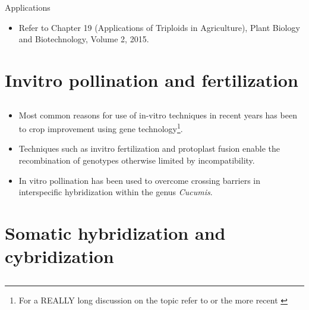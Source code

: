 \documentclass[
  ignorenonframetext,
  aspectratio=169]{beamer}
\providecommand{\tightlist}{%
  \setlength{\itemsep}{0pt}\setlength{\parskip}{0pt}}
\begin{document}
\begin{frame}{Applications}
\begin{itemize}
\tightlist
\item
  Refer to Chapter 19 (Applications of Triploids in Agriculture), Plant
  Biology and Biotechnology, Volume 2, 2015.
\end{itemize}
\end{frame}

\hypertarget{invitro-pollination-and-fertilization}{%
\section{Invitro pollination and
fertilization}\label{invitro-pollination-and-fertilization}}

\hypertarget{section-7}{%
\subsection{}\label{section-7}}

\begin{frame}{}
\begin{itemize}
\tightlist
\item
  Most common reasons for use of in-vitro techniques in recent years has
  been to crop improvement using gene
  technology\footnote[frame]{For a REALLY long discussion on the topic refer to \cite{bhojwani1986plant} or the more recent \cite{bhojwani2013plant}}.
\item
  Techniques such as invitro fertilization and protoplast fusion enable
  the recombination of genotypes otherwise limited by incompatibility.
\item
  In vitro pollination has been used to overcome crossing barriers in
  interspecific hybridization within the genus \emph{Cucumis}.
\end{itemize}
\end{frame}

\hypertarget{somatic-hybridization-and-cybridization}{%
\section{Somatic hybridization and
cybridization}\label{somatic-hybridization-and-cybridization}}

\hypertarget{section-8}{%
\subsection{}\label{section-8}}
\end{document}
